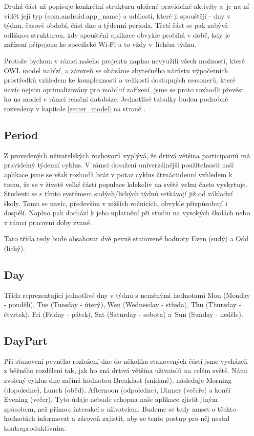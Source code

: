 \documentclass[thesis=M,czech]{FITthesis}[2012/06/26]
\begin{document}
Druhá část už popisuje konkrétní strukturu uložené pravidelné aktivity a~je na ní vidět její typ (com.android.app\_name) a události, které ji spouštějí - dny v týdnu, časové období, část dne a týdenní perioda. Třetí část se pak zabývá odlišnou strukturou, kdy spouštění aplikace obvykle probíhá v době, kdy je zařízení připojeno ke specifické Wi-Fi a to vždy v~lichém týdnu.

Protože bychom v rámci našeho projektu naplno nevyužili všech možností, které OWL model nabízí, a zároveň se obáváme zbytečného nárůstu výpočetních prostředků vzhledem ke komplexnosti a velikosti dostupných reasonerů, které navíc nejsou optimalizovány pro mobilní zařízení, jsme se proto rozhodli převést ho na model v rámci relační databáze. Jednotlivé tabulky budou podrobně rozvedeny v kapitole \ref{sec:er_model} na straně \pageref{sec:er_model}.

\subsection{Period}
Z provedených uživatelských rozhovorů vyplývá, že drtivá většina participantů má pravidelný týdenní cyklus. V rámci dosažení univerzálnější použitelnosti naší aplikace jsme se však rozhodli brát v potaz cyklus čtrnáctidenní vzhledem k tomu, že se v životě velké části populace kdekoliv na světě velmi často vyskytuje. Studenti se s tímto systémem sudých/lichých týdnů setkávají již od základní školy. Tomu se navíc, především v nižších ročnících, obvykle přizpůsobují i dospělí. Naplno pak dochází k jeho uplatnění při studiu na vysokých školách nebo v rámci pracovní doby zvané .

Tato třída tedy bude obsahovat dvě pevně stanovené hodnoty Even (sudý) a Odd (lichý).

\subsection{Day}
Třída reprezentující jednotlivé dny v týdnu s neměnými hodnotami Mon (Monday - pondělí), Tue (Tuesday - úterý), Wen (Wednesday - středa), Thu (Thursday - čtvrtek), Fri (Friday - pátek), Sat (Saturday - sobota) a~Sun (Sunday - neděle).

\subsection{DayPart}
Při stanovení pevného rozložení dne do několika stanovených částí jsme vycházeli z běžného rozdělení tak, jak ho zná drtivá většina uživatelů na celém světě. Námi zvolený cyklus dne začíná hodnotou Breakfast (snídaně), následuje Morning (dopoledne), Lunch (oběd), Afternoon (odpoledne), Dinner (večeře) a končí Evening (večer). Tyto údaje nebude schopna naše aplikace zjistit jiným způsobem, než přímou interakcí s uživatelem. Budeme se tedy muset o těchto hodnotách informovat a zároveň zajistit, aby se tento postup pro něj nestal kontraproduktivním.
\end{document}
